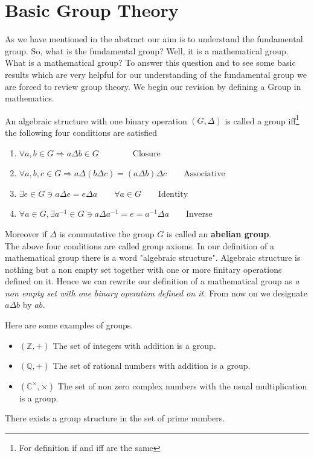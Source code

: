 \section{Basic Group Theory}
As we have mentioned in the abstract our aim is to understand the fundamental group. So, what is the fundamental group? Well, it is a mathematical group. What is a mathematical group? To answer this question and to see some basic results which are very helpful for our understanding of the fundamental group  we are forced to review group theory. We begin our revision by defining a Group in mathematics.

\begin{definition}
An algebraic structure with one binary operation $(G,\Delta)$ is called a group iff\footnote{For definition if and iff are the same} the following four conditions are satisfied
\begin{enumerate}
  \item $\forall a,b\in G \Rightarrow a\Delta b \in G \qquad \qquad \text{Closure}$
  \item $\forall a,b,c \in G \Rightarrow a\Delta (b\Delta c)=(a\Delta b)\Delta c\qquad \text{Associative}$
  \item $\exists e\in G \ni  a\Delta e=e\Delta a \qquad \forall a \in G\qquad \text{Identity}$
  \item $\forall a\in G ,\exists a^{-1}\in G \ni a\Delta a^{-1} =e=a^{-1}\Delta a \qquad \text{Inverse}$
\end{enumerate}
\end{definition}Moreover if $\Delta$ is commutative the group $G$ is called an \textbf{abelian group}.\\
The above four conditions are called group axioms. In our definition of a mathematical group there is a word "algebraic structure". Algebraic structure is nothing but a non empty set together with one or more finitary operations defined on it. Hence we can rewrite our definition of a mathematical group as \textit{a non empty set with one binary operation defined on it.} From now on we designate $a\Delta b$ by $ab$.
\begin{example}
Here are some examples of groups.
\begin{itemize}
  \item  $(\mathbb{Z},+)$ The set of integers with addition is a group.
  \item $(\mathbb{Q},+)$ The set of rational numbers with addition is a group.
  \item $(\mathbb{C}^\times,\times)$ The set of non zero complex numbers with the usual multiplication is a group.
\end{itemize}
\end{example}
\begin{conj}
There exists a group structure in the set of prime numbers.
\end{conj}

